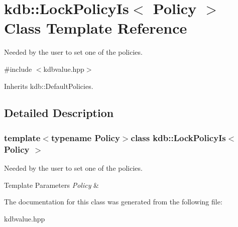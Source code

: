 \hypertarget{classkdb_1_1LockPolicyIs}{\section{kdb\+:\+:Lock\+Policy\+Is$<$ Policy $>$ Class Template Reference}
\label{classkdb_1_1LockPolicyIs}
}


Needed by the user to set one of the policies.  




{\ttfamily \#include $<$kdbvalue.\+hpp$>$}



Inherits kdb\+::\+Default\+Policies.



\subsection{Detailed Description}
\subsubsection*{template$<$typename Policy$>$class kdb\+::\+Lock\+Policy\+Is$<$ Policy $>$}

Needed by the user to set one of the policies. 


\begin{DoxyTemplParams}{Template Parameters}
{\em Policy} & \\
\hline
\end{DoxyTemplParams}


The documentation for this class was generated from the following file\+:\begin{DoxyCompactItemize}
\item 
kdbvalue.\+hpp\end{DoxyCompactItemize}
